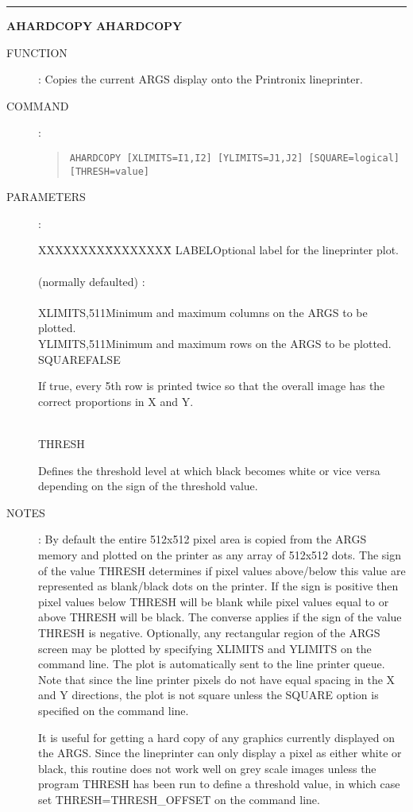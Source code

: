 \goodbreak
\rule{\textwidth}{0.3mm}
{\Large {\bf AHARDCOPY} \hfill {\bf AHARDCOPY}}
\begin{description}
\item [FUNCTION]:
Copies the current ARGS display onto the Printronix lineprinter.
\item [COMMAND]:
\begin{quote}
{\tt AHARDCOPY [XLIMITS=I1,I2] [YLIMITS=J1,J2] [SQUARE=logical] [THRESH=value]}
\end{quote}
\item [PARAMETERS]:
\begin{tabbing}
XXXXXXXX\=XXXXXXXX\=\kill
LABEL\>\>Optional label for the lineprinter plot.\\
\\
(normally defaulted) :\\
\\
XLIMITS,511\>Minimum and maximum columns on the ARGS to be plotted.\\
YLIMITS,511\>Minimum and maximum rows on the ARGS to be plotted.\\
SQUARE\>FALSE\>\begin{minipage}[t]{100mm}
If true, every 5th row is printed twice so that the overall image has the
correct proportions in X and Y.
\end{minipage}\\
THRESH\>\begin{minipage}[t]{100mm}
Defines the threshold level at which black becomes white or vice versa
depending on the sign of the threshold value.
\end{minipage}
\end{tabbing}
\item [NOTES]:
By default the entire 512x512 pixel area is copied from the ARGS memory and
plotted on the printer as any array of 512x512 dots.
The sign of the value THRESH determines if pixel values above/below this value
are represented as blank/black dots on the printer.
If the sign is positive then pixel values below THRESH will be blank while
pixel values equal to or above THRESH will be black.
The converse applies if the sign of the value THRESH is negative.
Optionally, any rectangular region of the ARGS screen may be plotted by
specifying XLIMITS and YLIMITS on the command line.
The plot is automatically sent to the line printer queue.
Note that since the line printer pixels do not have equal spacing in the X and
Y directions, the plot is not square unless the SQUARE option is specified on
the command line.

It is useful for getting a hard copy of any graphics currently displayed on the
ARGS. 
Since the lineprinter can only display a pixel as either white or black, this
routine does not work well on grey scale images unless the program THRESH has
been run to define a threshold value, in which case set THRESH=THRESH\_OFFSET
on the command line.
\end{description}

